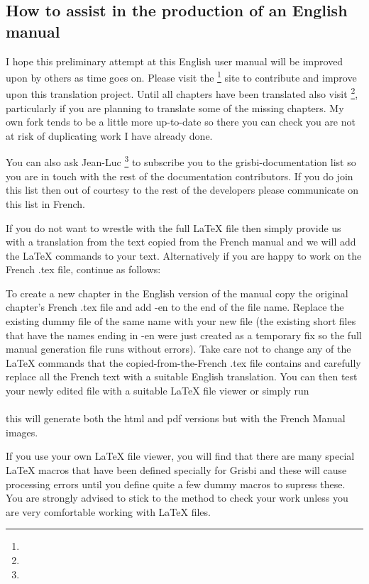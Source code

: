 \subsection*{How to assist in the production of an English manual}

I hope this preliminary attempt at this English user manual will be improved upon by others as time goes on. Please visit the \footnote{\urlGitDoc{}} site to contribute and improve upon this translation project. Until all chapters have been translated also visit  \footnote{\urlBobDoc{}}, particularly if you are planning to translate some of the missing chapters.  My own fork tends to be a little more up-to-date so there you can check you are not at risk of duplicating work I have already done.  

You can also ask {Jean-Luc }\footnote{\urlJeanLucDuflotEmail{}} to subscribe you to the grisbi-documentation list so you are in touch with the rest of the documentation contributors. If you do join this list then out of courtesy to the rest of the developers please communicate on this list in French.  

If you do not want to wrestle with the full \LaTeX{} file then simply provide us with a translation from the text copied from the French manual and we will add the  \LaTeX{} commands to your text. Alternatively if you are happy to work on the French .tex file, continue as follows:

To create a new chapter in the English version of the manual copy the original chapter's French .tex file and add -en to the end of the file name.  Replace the existing dummy file of the same name with your new file (the existing short files that have the names ending in -en were just created as a temporary fix so the full manual generation  file runs without errors).  Take care not to change any of the \LaTeX{} commands that the copied-from-the-French .tex file contains and carefully replace all the French text with a suitable English translation.  You can then test your newly edited file with a suitable \LaTeX{} file viewer or simply run 
\\
\\this will generate both the html and pdf versions but with the French Manual images.

 If you use your own \LaTeX{} file viewer, you will find that there are many special \LaTeX{} macros that have been defined specially for Grisbi and these will cause processing errors until you define quite a few dummy macros to supress these. You are strongly advised to stick to the  method to check your work unless you are very comfortable working with \LaTeX{} files.

